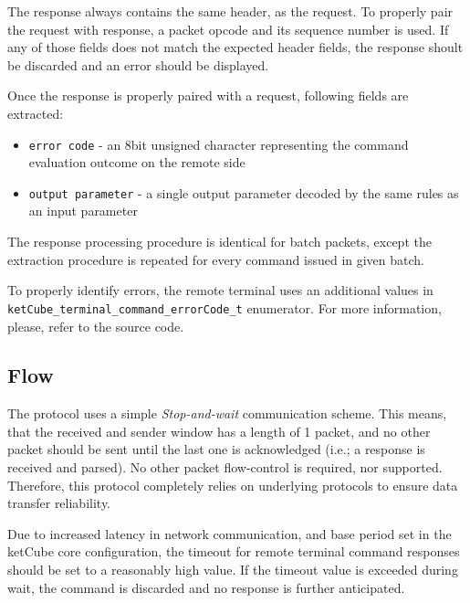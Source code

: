 The response always contains the same header, as the request. To properly pair the request with response, a packet opcode and its sequence number is used. If any of those fields does not match the expected header fields, the response shoult be discarded and an error should be displayed.

Once the response is properly paired with a request, following fields are extracted:

\begin{itemize}
	\item \texttt{error code} - an 8bit unsigned character representing the command evaluation outcome on the remote side
	\item \texttt{output parameter} - a single output parameter decoded by the same rules as an input parameter
\end{itemize}

The response processing procedure is identical for batch packets, except the extraction procedure is repeated for every command issued in given batch.

To properly identify errors, the remote terminal uses an additional values in \texttt{ketCube\_terminal\_command\_errorCode\_t} enumerator. For more information, please, refer to the source code.

\subsection{Flow}

The protocol uses a simple \textit{Stop-and-wait} communication scheme. This means, that the received and sender window has a length of 1 packet, and no other packet should be sent until the last one is acknowledged (i.e.; a response is received and parsed). No other packet flow-control is required, nor supported. Therefore, this protocol completely relies on underlying protocols to ensure data transfer reliability.

Due to increased latency in network communication, and base period set in the ketCube core configuration, the timeout for remote terminal command responses should be set to a reasonably high value. If the timeout value is exceeded during wait, the command is discarded and no response is further anticipated.

  
  




  




